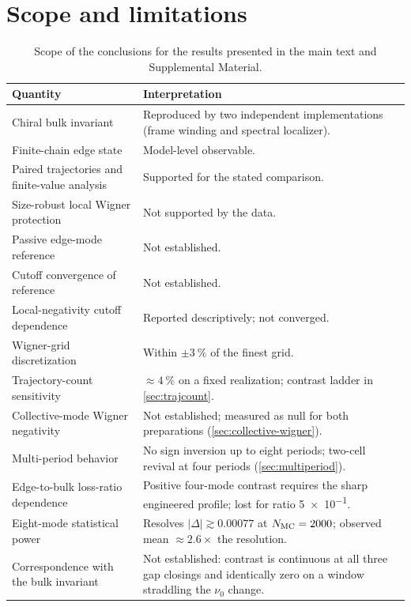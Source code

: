 \documentclass[aps,pra,preprint,superscriptaddress,amsmath,amssymb]{revtex4-2}
\begin{document}
\section{Scope and limitations}
\label{sec:scope-limitations}

\begin{table}[!htbp]
\renewcommand{\arraystretch}{1.35}
\caption{Scope of the conclusions for the results presented in the main text and Supplemental Material.}
\label{tab:scope-limitations}
\begin{tabularx}{\linewidth}{lX}
\textbf{Quantity} & \textbf{Interpretation} \\
\hline
Chiral bulk invariant & Reproduced by two independent implementations (frame winding and spectral localizer). \\\hline
Finite-chain edge state & Model-level observable. \\\hline
Paired trajectories and finite-value analysis & Supported for the stated comparison. \\\hline
Size-robust local Wigner protection & Not supported by the data. \\\hline
Passive edge-mode reference & Not established. \\\hline
Cutoff convergence of reference & Not established. \\\hline
Local-negativity cutoff dependence & Reported descriptively; not converged. \\\hline
Wigner-grid discretization & Within $\pm\qty{3}{\percent}$ of the finest grid. \\\hline
Trajectory-count sensitivity & $\approx\qty{4}{\percent}$ on a fixed realization; contrast ladder in \cref{sec:trajcount}. \\\hline
Collective-mode Wigner negativity & Not established; measured as null for both preparations (\cref{sec:collective-wigner}). \\\hline
Multi-period behavior & No sign inversion up to eight periods; two-cell revival at four periods (\cref{sec:multiperiod}). \\\hline
Edge-to-bulk loss-ratio dependence & Positive four-mode contrast requires the sharp engineered profile; lost for ratio \num{5e-1}. \\\hline
Eight-mode statistical power & Resolves $|\Delta|\gtrsim\num{0.00077}$ at $N_{\rm MC}=\num{2000}$; observed mean $\approx\num{2.6}\times$ the resolution. \\\hline
Correspondence with the bulk invariant & Not established: contrast is continuous at all three gap closings and identically zero on a window straddling the $\nu_0$ change. \\\hline

\end{tabularx}
\end{table}
\end{document}
